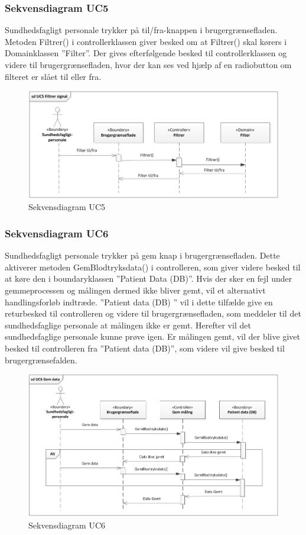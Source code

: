 \subsubsection{Sekvensdiagram UC5}
Sundhedsfagligt personale trykker på til/fra-knappen i brugergrænsefladen. Metoden Filtrer() i controllerklassen giver besked om at Filtrer() skal kørers i Domainklassen ”Filter”. Der gives efterfølgende besked til controllerklassen og videre til brugergrænsefladen, hvor der kan ses ved hjælp af en radiobutton om filteret er slået til eller fra.
\begin{figure}[H]
\centering
\includegraphics[scale=0.70]{sd5.PNG}
\caption{Sekvensdiagram UC5}
\end{figure}

\subsubsection{Sekvensdiagram UC6}
Sundhedsfagligt personale trykker på gem knap i brugergrænsefladen. Dette aktiverer metoden GemBlodtryksdata() i controlleren, som giver videre besked til at køre den i boundaryklassen ”Patient Data (DB)”. Hvis der sker en fejl under gemmeprocessen og målingen dermed ikke bliver gemt, vil et alternativt handlingsforløb indtræde. ”Patient data (DB) ” vil i dette tilfælde give en returbesked til controlleren og videre til brugergrænsefladen, som meddeler til det sundhedsfaglige personale at målingen ikke er gemt. Herefter vil det sundhedsfaglige personale kunne prøve igen. 
Er målingen gemt, vil der blive givet besked til controlleren fra ”Patient data (DB)”, som videre vil give besked til brugergrænsefalden. 

\begin{figure}[H]
\centering
\includegraphics[scale=0.70]{sd6.PNG}
\caption{Sekvensdiagram UC6}
\end{figure}

